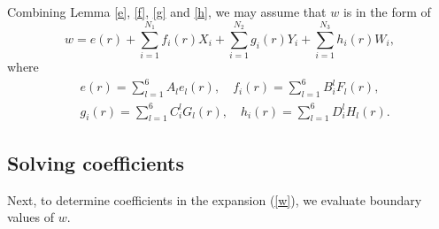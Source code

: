 \documentclass[11pt,letterpaper]{amsart}
\theoremstyle{definition}
\theoremstyle{remark}
\numberwithin{equation}{section}
\begin{document}
Combining Lemma \ref{e}, \ref{f}, \ref{g} and \ref{h}, we may assume that $w$ is in the form of
\begin{equation*}
    w=e(r)+\sum_{i=1}^{N_1}f_i(r)X_i+\sum_{i=1}^{N_2}g_i(r)Y_i+\sum_{i=1}^{N_3}h_i(r)W_i,
\end{equation*}
where
\begin{equation}\label{w}
    \begin{split}
        &e(r)=\sum_{l=1}^{6}A_l e_l(r), \quad f_i(r)=\sum_{l=1}^{6}B^l_i F_l(r),\\
        &g_i(r)=\sum_{l=1}^{6}C^l_i G_l(r),\quad h_i(r)=\sum_{l=1}^{6}D^l_i H_l(r).
    \end{split}
\end{equation}

\subsection{Solving coefficients}\label{coefficients}
Next, to determine coefficients in the expansion (\ref{w}), we evaluate boundary values of $w$. 
\end{document}
